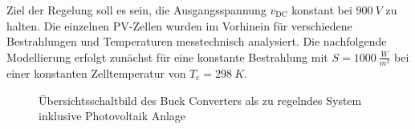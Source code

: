 Ziel der Regelung soll es sein, die Ausgangsspannung $v_{\mathrm{DC}}$ konstant bei $\SI{900}{V}$ zu halten. Die einzelnen PV-Zellen wurden im Vorhinein für verschiedene Bestrahlungen und Temperaturen messtechnisch analysiert. Die nachfolgende Modellierung erfolgt zunächst für eine konstante Bestrahlung mit $S = \SI{1000}{\frac{W}{m^2}}$ bei einer konstanten Zelltemperatur von $T_{\mathrm{c}} = \SI{298}{K}$.

\begin{figure}[H]
   \centering
   \caption[Skizze der Regelaufgabe]{Übersichtsschaltbild des Buck Converters als zu regelndes System inklusive Photovoltaik Anlage}
   \label{fig:Bild1}
\end{figure}